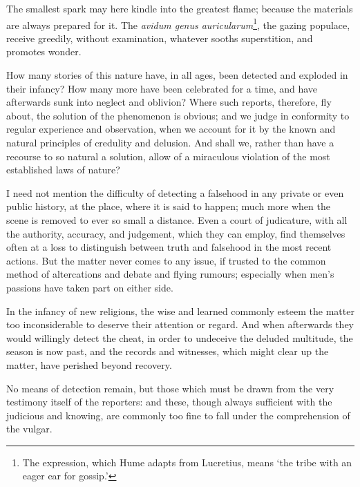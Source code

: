 \documentclass[]{article}
\begin{document}
\begin{sectionbody}
\humeparagraph  The smallest spark may here kindle into the greatest flame; because the materials are always prepared for it. The \emph{avidum genus auricularum}\footnote{The expression, which Hume adapts from Lucretius, means `the tribe with an eager ear for gossip.'}, the gazing populace, receive greedily, without examination, whatever sooths superstition, and promotes wonder.

\humeparagraph  How many stories of this nature have, in all ages, been detected and exploded in their infancy? How many more have been celebrated for a time, and have afterwards sunk into neglect and oblivion? Where such reports, therefore, fly about, the solution of the phenomenon is obvious; and we judge in conformity to regular experience and observation, when we account for it by the known and natural principles of credulity and delusion. And shall we, rather than have a recourse to so natural a solution, allow of a miraculous violation of the most established laws of nature?

\humeparagraph  I need not mention the difficulty of detecting a falsehood in any private or even public history, at the place, where it is said to happen; much more when the scene is removed to ever so small a distance. Even a court of judicature, with all the authority, accuracy, and judgement, which they can employ, find themselves often at a loss to distinguish between truth and falsehood in the most recent actions. But the matter never comes to any issue, if trusted to the common method of altercations and debate and flying rumours; especially when men's passions have taken part on either side.

\humeparagraph  In the infancy of new religions, the wise and learned commonly esteem the matter too inconsiderable to deserve their attention or regard. And when afterwards they would willingly detect the cheat, in order to undeceive the deluded multitude, the season is now past, and the records and witnesses, which might clear up the matter, have perished beyond recovery.

\humeparagraph  No means of detection remain, but those which must be drawn from the very testimony itself of the reporters: and these, though always sufficient with the judicious and knowing, are commonly too fine to fall under the comprehension of the vulgar.


\end{sectionbody}
\end{document}
